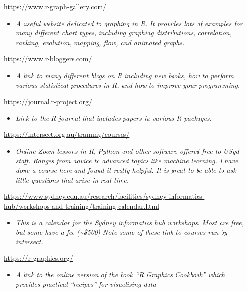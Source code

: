 \documentclass[
]{book}
\providecommand{\tightlist}{%
  \setlength{\itemsep}{0pt}\setlength{\parskip}{0pt}}
\begin{document}
\url{https://www.r-graph-gallery.com/}

\begin{itemize}
\tightlist
\item
  \emph{A useful website dedicated to graphing in R. It provides lots of examples for many different chart types, including graphing distributions, correlation, ranking, evolution, mapping, flow, and animated graphs.}
\end{itemize}

\url{https://www.r-bloggers.com/}

\begin{itemize}
\tightlist
\item
  \emph{A link to many different blogs on R including new books, how to perform various statistical procedures in R, and how to improve your programming.}
\end{itemize}

\url{https://journal.r-project.org/}

\begin{itemize}
\tightlist
\item
  \emph{Link to the R journal that includes papers in various R packages.}
\end{itemize}

\url{https://intersect.org.au/training/courses/}

\begin{itemize}
\tightlist
\item
  \emph{Online Zoom lessons in R, Python and other software offered free to USyd staff. Ranges from novice to advanced topics like machine learning. I have done a course here and found it really helpful. It is great to be able to ask little questions that arise in real-time.}
\end{itemize}

\url{https://www.sydney.edu.au/research/facilities/sydney-informatics-hub/workshops-and-training/training-calendar.html}

\begin{itemize}
\tightlist
\item
  \emph{This is a calendar for the Sydney informatics hub workshops. Most are free, but some have a fee (\textasciitilde\$500) Note some of these link to courses run by intersect.}
\end{itemize}

\url{https://r-graphics.org/}

\begin{itemize}
\tightlist
\item
  \emph{A link to the online version of the book ``R Graphics Cookbook'' which provides practical ``recipes'' for visualising data}
\end{itemize}
\end{document}
